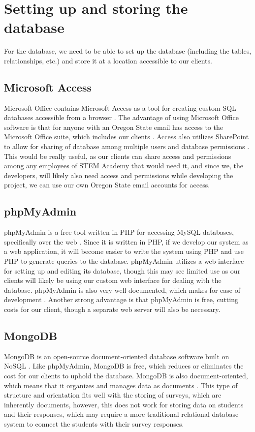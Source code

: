 \documentclass{IEEEtran}
\begin{document}
\section{Setting up and storing the database}
For the database, we need to be able to set up the database (including the tables, relationships, etc.) and store it at a location accessible to our clients.
\subsection{Microsoft Access}
Microsoft Office contains Microsoft Access as a tool for creating custom SQL databases accessible from a browser \cite{access}.
The advantage of using Microsoft Office software is that for anyone with an Oregon State email has access to the Microsoft Office suite, which includes our clients \cite{microsoftsoftware}.
Access also utilizes SharePoint to allow for sharing of database among multiple users and database permissions \cite{access}.
This would be really useful, as our clients can share access and permissions among any employees of STEM Academy that would need it, and since we, the developers, will likely also need access and permissions while developing the project, we can use our own Oregon State email accounts for access.
\subsection{phpMyAdmin}
phpMyAdmin is a free tool written in PHP for accessing MySQL databases, specifically over the web \cite{phpmyadmin}.
Since it is written in PHP, if we develop our system as a web application, it will become easier to write the system using PHP and use PHP to generate queries to the database.
phpMyAdmin utilizes a web interface for setting up and editing its database, though this may see limited use as our clients will likely be using our custom web interface for dealing with the database.
phpMyAdmin is also very well documented, which makes for ease of development \cite{phpmyadmin}.
Another strong advantage is that phpMyAdmin is free, cutting costs for our client, though a separate web server will also be necessary.
\subsection{MongoDB}
MongoDB is an open-source document-oriented database software built on NoSQL \cite{mongodb}.
Like phpMyAdmin, MongoDB is free, which reduces or eliminates the cost for our clients to uphold the database.
MongoDB is also document-oriented, which means that it organizes and manages data as documents \cite{docdb}.
This type of structure and orientation fits well with the storing of surveys, which are inherently documents, however, this does not work for storing data on students and their responses, which may require a more traditional relational database system to connect the students with their survey responses.
\end{document}
